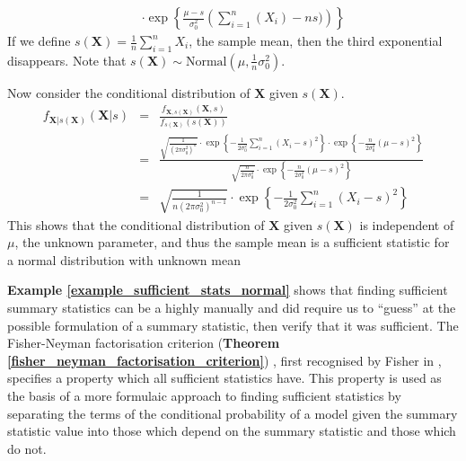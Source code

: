 \documentclass[bibliography=totoc,11pt,a4paper,margin=0]{article}
\theoremstyle{break}
\begin{document}
\begin{box_example}
\[\begin{array}{rcl}
      &&\cdot\exp\left\{\frac{\mu-s}{\sigma_0^2}\left(\sum_{i=1}^n(X_i)-ns)\right)\right\}
    \end{array}\]
    If we define $s(\mathbf{X})=\frac1n\sum_{i=1}^nX_i$, the sample mean, then the third exponential disappears. Note that $s(\mathbf{X})\sim\text{Normal}\left(\mu,\frac1n\sigma_0^2\right)$.
    \par Now consider the conditional distribution of $\mathbf{X}$ given $s(\mathbf{X})$.
    \[\begin{array}{rcl}
      f_{\mathbf{X}|s(\mathbf{X})}(\mathbf{X}|s)&=&\frac{f_{\mathbf{X},s(\mathbf{X})}(\mathbf{X},s)}{f_{s(\mathbf{X})}(s(\mathbf{X}))}\\
      &=&\frac{\sqrt{\frac1{\left(2\pi\sigma_0^2\right)^n}}\cdot\exp\left\{-\frac1{2\sigma_0^2}\sum_{i=1}^n(X_i-s)^2\right\}\cdot\exp\left\{-\frac{n}{2\sigma_0^2}(\mu-s)^2\right\}}{\sqrt{\frac{n}{2\pi\sigma_0^2}}\cdot\exp\left\{-\frac{n}{2\sigma_0^2}(\mu-s)^2\right\}}\\
      &=&\sqrt{\frac{1}{n(2\pi\sigma_0^2)^{n-1}}}\cdot\exp\left\{-\frac1{2\sigma_0^2}\sum_{i=1}^n(X_i-s)^2\right\}
    \end{array}\]
    This shows that the conditional distribution of $\mathbf{X}$ given $s(\mathbf{X})$ is independent of $\mu$, the unknown parameter, and thus the sample mean is a sufficient statistic for a normal distribution with unknown mean
  \end{box_example}

  \par \textbf{Example \ref{example_sufficient_stats_normal}} shows that finding sufficient summary statistics can be a highly manually and did require us to ``guess'' at the possible formulation of a summary statistic, then verify that it was sufficient. The Fisher-Neyman factorisation criterion (\textbf{Theorem \ref{fisher_neyman_factorisation_criterion}}) \cite[]{fnf_fisher_part,fnf_neyman_part}, first recognised by Fisher in \cite[]{fnf_fisher_part}, specifies a property which all sufficient statistics have. This property is used as the basis of a more formulaic approach to finding sufficient statistics by separating the terms of the conditional probability of a model given the summary statistic value into those which depend on the summary statistic and those which do not.
\end{document}
